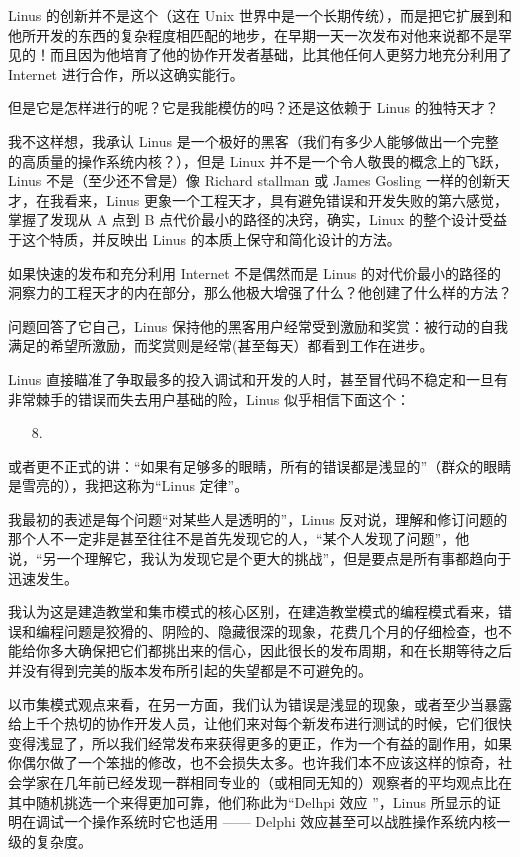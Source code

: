 Linus 的创新并不是这个（这在 Unix 世界中是一个长期传统），而是把它扩展到和他所开发的东西的复杂程度相匹配的地步，在早期一天一次发布对他来说都不是罕见的！而且因为他培育了他的协作开发者基础，比其他任何人更努力地充分利用了 Internet 进行合作，所以这确实能行。


但是它是怎样进行的呢？它是我能模仿的吗？还是这依赖于 Linus 的独特天才？


我不这样想，我承认 Linus 是一个极好的黑客（我们有多少人能够做出一个完整的高质量的操作系统内核？），但是 Linux 并不是一个令人敬畏的概念上的飞跃，Linus 不是（至少还不曾是）像 Richard stallman 或 James Gosling 一样的创新天才，在我看来，Linus 更象一个工程天才，具有避免错误和开发失败的第六感觉，掌握了发现从 A 点到 B 点代价最小的路径的决窍，确实，Linux 的整个设计受益于这个特质，并反映出 Linus 的本质上保守和简化设计的方法。


如果快速的发布和充分利用 Internet 不是偶然而是 Linus 的对代价最小的路径的洞察力的工程天才的内在部分，那么他极大增强了什么？他创建了什么样的方法？


问题回答了它自己，Linus 保持他的黑客用户经常受到激励和奖赏：被行动的自我满足的希望所激励，而奖赏则是经常(甚至每天）都看到工作在进步。


Linus 直接瞄准了争取最多的投入调试和开发的人时，甚至冒代码不稳定和一旦有非常棘手的错误而失去用户基础的险，Linus 似乎相信下面这个：

\begin{enumerate}
\item[8.] \\ 
\end{enumerate}

或者更不正式的讲：“如果有足够多的眼睛，所有的错误都是浅显的”（群众的眼睛是雪亮的），我把这称为“Linus 定律”。


我最初的表述是每个问题“对某些人是透明的”，Linus 反对说，理解和修订问题的那个人不一定非是甚至往往不是首先发现它的人，“某个人发现了问题”，他说，“另一个理解它，我认为发现它是个更大的挑战”，但是要点是所有事都趋向于迅速发生。


我认为这是建造教堂和集市模式的核心区别，在建造教堂模式的编程模式看来，错误和编程问题是狡猾的、阴险的、隐藏很深的现象，花费几个月的仔细检查，也不能给你多大确保把它们都挑出来的信心，因此很长的发布周期，和在长期等待之后并没有得到完美的版本发布所引起的失望都是不可避免的。


以市集模式观点来看，在另一方面，我们认为错误是浅显的现象，或者至少当暴露给上千个热切的协作开发人员，让他们来对每个新发布进行测试的时候，它们很快变得浅显了，所以我们经常发布来获得更多的更正，作为一个有益的副作用，如果你偶尔做了一个笨拙的修改，也不会损失太多。也许我们本不应该这样的惊奇，社会学家在几年前已经发现一群相同专业的（或相同无知的）观察者的平均观点比在其中随机挑选一个来得更加可靠，他们称此为“Delhpi 效应 ”，Linus 所显示的证明在调试一个操作系统时它也适用 —— Delphi 效应甚至可以战胜操作系统内核一级的复杂度。


